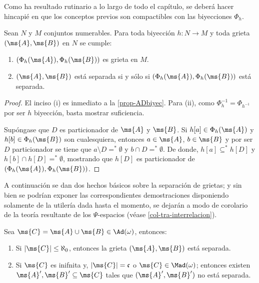 	Como ha resultado rutinario a lo largo de todo el capítulo, se deberá hacer hincapié en que los conceptos previos son compactibles con las biyecciones $\Phi_h$.
	\begin{proposicion}\label{prop-grietasBiyec}
		Sean $N$ y $M$ conjuntos numerables. Para toda biyección $h:N \to M$ y toda grieta $(\ms{A},\ms{B})$ en $N$ se cumple:
		\begin{enumerate}
			\item $(\Phi_h(\ms{A}),\Phi_h(\ms{B}))$ es grieta en $M$.
			\item $(\ms{A},\ms{B})$ está separada si y sólo si $(\Phi_h(\ms{A}),\Phi_h(\ms{B}))$ está separada.
		\end{enumerate}
	\end{proposicion}
	\begin{proof}
		El inciso (i) es inmediato a la \autoref{prop-ADbiyec}. Para (ii), como $\Phi_h^{-1}=\Phi_{h^{-1}}$ por ser $h$ biyección, basta mostrar suficiencia.

		Supóngase que $D$ es particionador de $\ms{A}$ y $\ms{B}$. Si $h[a] \in \Phi_h(\ms{A})$ y $h[b] \in \Phi_h(\ms{B})$ son cualesquiera, entonces $a \in \ms{A}$, $b \in \ms{B}$ y por ser $D$ particionador se tiene que $a \setminus D =^* \emptyset$ y $b \cap D =^* \emptyset$. De donde, $h[a] \subseteq^* h[D]$ y $h[b] \cap h[D] =^* \emptyset$, mostrando que $h[D]$ es particionador de $(\Phi_h(\ms{A}),\Phi_h(\ms{B}))$.
	\end{proof}

	A continuación se dan dos hechos básicos sobre la separación de grietas; y sin bien se podrían exponer las correspondientes demostraciones disponiendo solamente de la utilería dada hasta el momento, se dejarán a modo de corolario de la teoría resultante de los $\Psi$-espacios (véase \ref{col-tra-interrelacion}).

	\begin{ejemplo}\label{ej-interrelacion}
		Sea $\ms{C}=\ms{A} \cup \ms{B} \in \Ad(\omega)$, entonces:
        \begin{enumerate}
            \item Si $|\ms{C}|\leq \aleph_0$, entonces la grieta $(\ms{A},\ms{B})$ está separada.
            \item Si $\ms{C}$ es inifnita y, $|\ms{C}|=\mathfrak{c}$ o $\ms{C}\in \Mad(\omega)$; entonces existen $\ms{A}',\ms{B}' \subseteq \ms{C}$ tales que $(\ms{A}',\ms{B}')$ no está separada.
        \end{enumerate}
	\end{ejemplo}

